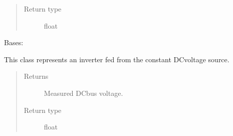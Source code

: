 \documentclass[letterpaper,10pt,english]{sphinxmanual}
\begin{document}
\begin{fulllineitems}
\begin{fulllineitems}
\begin{quote}
\begin{description}
\item[{Return type}] \leavevmode
\sphinxAtStartPar
float

\end{description}\end{quote}

\end{fulllineitems}


\end{fulllineitems}


\begin{fulllineitems}
\label{\detokenize{model:model.converter.Inverter}}
\pysigstartsignatures
{}
\pysigstopsignatures
\sphinxAtStartPar
Bases: 

\sphinxAtStartPar
This class represents an inverter fed from the constant DC\sphinxhyphen{}voltage source.

\begin{fulllineitems}
\label{\detokenize{model:model.converter.Inverter.meas_dc_voltage}}
\pysigstartsignatures
{}
\pysigstopsignatures\begin{quote}\begin{description}
\item[{Returns}] \leavevmode
\sphinxAtStartPar
Measured DC\sphinxhyphen{}bus voltage.

\item[{Return type}] \leavevmode
\sphinxAtStartPar
float

\end{description}\end{quote}

\end{fulllineitems}


\end{fulllineitems}

\end{document}
